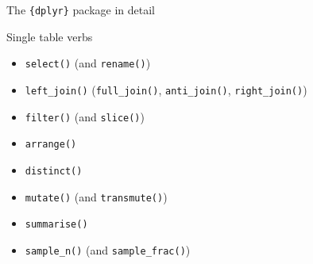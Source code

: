 \documentclass[ignorenonframetext,]{beamer}
\providecommand{\tightlist}{%
  \setlength{\itemsep}{0pt}\setlength{\parskip}{0pt}}
\begin{document}
\begin{frame}[fragile]{The \texttt{\{dplyr\}} package in detail}
\begin{block}{Single table verbs}
\begin{itemize}
\tightlist
\item
  \texttt{select()} (and \texttt{rename()})
\item
  \texttt{left\_join()} (\texttt{full\_join()}, \texttt{anti\_join()},
  \texttt{right\_join()})
\item
  \texttt{filter()} (and \texttt{slice()})
\item
  \texttt{arrange()}
\item
  \texttt{distinct()}
\item
  \texttt{mutate()} (and \texttt{transmute()})
\item
  \texttt{summarise()}
\item
  \texttt{sample\_n()} (and \texttt{sample\_frac()})
\end{itemize}

\end{block}

\end{frame}
\end{document}
